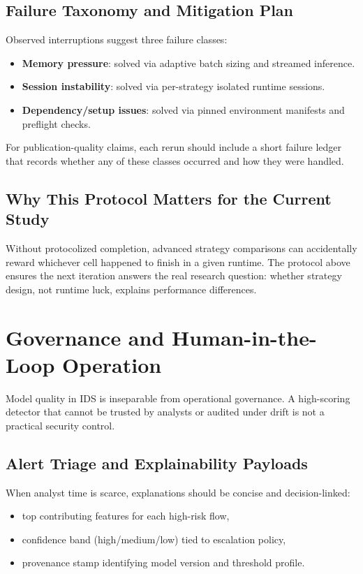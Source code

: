 \documentclass[10pt,journal]{IEEEtran}
\begin{document}
\subsection{Failure Taxonomy and Mitigation Plan}
Observed interruptions suggest three failure classes:
\begin{itemize}
\item \textbf{Memory pressure}: solved via adaptive batch sizing and streamed inference.
\item \textbf{Session instability}: solved via per-strategy isolated runtime sessions.
\item \textbf{Dependency/setup issues}: solved via pinned environment manifests and preflight checks.
\end{itemize}

For publication-quality claims, each rerun should include a short failure ledger that records whether any of these classes occurred and how they were handled.

\subsection{Why This Protocol Matters for the Current Study}
Without protocolized completion, advanced strategy comparisons can accidentally reward whichever cell happened to finish in a given runtime. The protocol above ensures the next iteration answers the real research question: whether strategy design, not runtime luck, explains performance differences.

\section{Governance and Human-in-the-Loop Operation}
Model quality in IDS is inseparable from operational governance. A high-scoring detector that cannot be trusted by analysts or audited under drift is not a practical security control.

\subsection{Alert Triage and Explainability Payloads}
When analyst time is scarce, explanations should be concise and decision-linked:
\begin{itemize}
\item top contributing features for each high-risk flow,
\item confidence band (high/medium/low) tied to escalation policy,
\item provenance stamp identifying model version and threshold profile.
\end{itemize}
\end{document}
